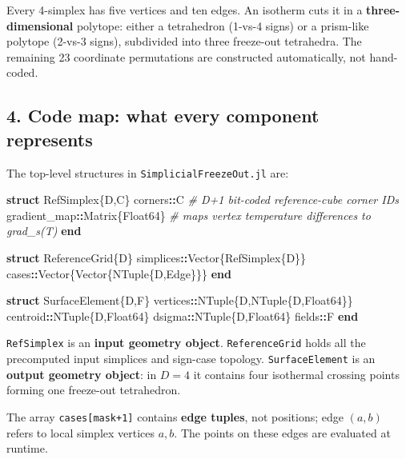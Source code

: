 \documentclass[
  10pt,
]{article}
\newenvironment{Shaded}{\begin{snugshade}}{\end{snugshade}}
\newcommand{\CommentTok}[1]{\textcolor[rgb]{0.56,0.35,0.01}{\textit{#1}}}
\newcommand{\DataTypeTok}[1]{\textcolor[rgb]{0.13,0.29,0.53}{#1}}
\newcommand{\KeywordTok}[1]{\textcolor[rgb]{0.13,0.29,0.53}{\textbf{#1}}}
\newcommand{\NormalTok}[1]{#1}
\newcommand{\OperatorTok}[1]{\textcolor[rgb]{0.81,0.36,0.00}{\textbf{#1}}}
\begin{document}
Every 4-simplex has five vertices and ten edges. An isotherm cuts it in
a \textbf{three-dimensional} polytope: either a tetrahedron (1-vs-4
signs) or a prism-like polytope (2-vs-3 signs), subdivided into three
freeze-out tetrahedra. The remaining 23 coordinate permutations are
constructed automatically, not hand-coded.

\subsection{4. Code map: what every component
represents}\label{code-map-what-every-component-represents}

The top-level structures in \texttt{SimplicialFreezeOut.jl} are:

\begin{Shaded}
\begin{Highlighting}[]
\KeywordTok{struct}\NormalTok{ RefSimplex\{D,C\}}
\NormalTok{    corners}\OperatorTok{::}\DataTypeTok{C                   }\CommentTok{\# D+1 bit{-}coded reference{-}cube corner IDs}
\NormalTok{    gradient\_map}\OperatorTok{::}\DataTypeTok{Matrix\{Float64\}  }\CommentTok{\# maps vertex temperature differences to grad\_s(T)}
\KeywordTok{end}

\KeywordTok{struct}\NormalTok{ ReferenceGrid\{D\}}
\NormalTok{    simplices}\OperatorTok{::}\DataTypeTok{Vector\{RefSimplex\{D\}\}}
\NormalTok{    cases}\OperatorTok{::}\DataTypeTok{Vector\{Vector\{NTuple\{D,Edge\}\}\}}
\KeywordTok{end}

\KeywordTok{struct}\NormalTok{ SurfaceElement\{D,F\}}
\NormalTok{    vertices}\OperatorTok{::}\DataTypeTok{NTuple\{D,NTuple\{D,Float64\}\}}
\NormalTok{    centroid}\OperatorTok{::}\DataTypeTok{NTuple\{D,Float64\}}
\NormalTok{    dsigma}\OperatorTok{::}\DataTypeTok{NTuple\{D,Float64\}}
\NormalTok{    fields}\OperatorTok{::}\DataTypeTok{F}
\KeywordTok{end}
\end{Highlighting}
\end{Shaded}

\texttt{RefSimplex} is an \textbf{input geometry object}.
\texttt{ReferenceGrid} holds all the precomputed input simplices and
sign-case topology. \texttt{SurfaceElement} is an \textbf{output
geometry object}: in \(D=4\) it contains four isothermal crossing points
forming one freeze-out tetrahedron.

The array \texttt{cases{[}mask+1{]}} contains \textbf{edge tuples}, not
positions; edge \((a,b)\) refers to local simplex vertices \(a,b\). The
points on these edges are evaluated at runtime.
\end{document}
